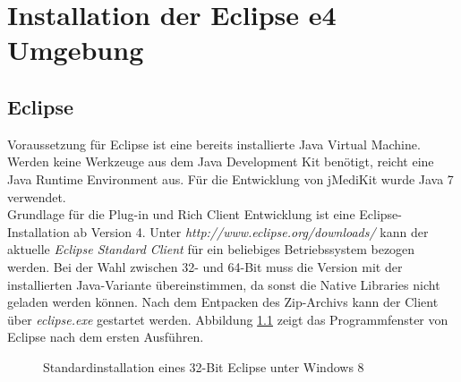 \chapter{Installation der Eclipse e4 Umgebung} \label{install_eclipse}
\section{Eclipse}
Voraussetzung für Eclipse ist eine bereits installierte Java Virtual Machine. Werden keine Werkzeuge aus dem Java Development Kit benötigt, reicht eine Java Runtime Environment aus. Für die Entwicklung von jMediKit wurde Java 7 verwendet.\\
Grundlage für die Plug-in und Rich Client Entwicklung ist eine Eclipse-Installation ab Version 4. Unter \textit{http://www.eclipse.org/downloads/} kann der aktuelle \textit{Eclipse Standard Client} für ein beliebiges Betriebssystem bezogen werden. Bei der Wahl zwischen 32- und 64-Bit muss die Version mit der installierten Java-Variante übereinstimmen, da sonst die Native Libraries nicht geladen werden können. Nach dem Entpacken des Zip-Archivs kann der Client über \textit{eclipse.exe} gestartet werden. Abbildung \ref{eclipsestd} zeigt das Programmfenster von Eclipse nach dem ersten Ausführen.\\

\begin{figure}[H]
  \vspace{0.5cm}
  \centering
  \caption{Standardinstallation eines 32-Bit Eclipse unter Windows 8}
  \label{eclipsestd}
  \vspace{0.5cm}
\end{figure}

